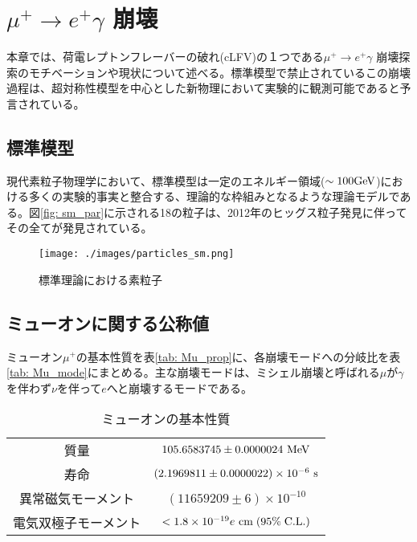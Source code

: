 \documentclass[Yonemoto_master.tex]{subfiles}
\begin{document}
\chapter{$\mu^+ \to e^+ \gamma$ 崩壊}
本章では、荷電レプトンフレーバーの破れ(cLFV)の１つである$\mu^+ \to e^+ \gamma$ 崩壊探索のモチベーションや現状について述べる。標準模型で禁止されているこの崩壊過程は、超対称性模型を中心とした新物理において実験的に観測可能であると予言されている。

\section{標準模型}
現代素粒子物理学において、標準模型は一定のエネルギー領域($\sim 100 {\rm GeV}$)における多くの実験的事実と整合する、理論的な枠組みとなるような理論モデルである。図\ref{fig: sm_par}に示される18の粒子は、2012年のヒッグス粒子発見に伴ってその全てが発見されている。
\begin{figure}[h]
\begin{center}
\texttt{[image: ./images/particles\_sm.png]}
\caption{標準理論における素粒子 \cite{particles_sm}}
\end{center}
\end{figure}
\label{fig: sm_par}

\section{ミューオンに関する公称値}
ミューオン$\mu^+$の基本性質を表\ref{tab: Mu_prop}に、各崩壊モードへの分岐比を表\ref{tab: Mu_mode}にまとめる。主な崩壊モードは、ミシェル崩壊と呼ばれる$\mu$が$\gamma$を伴わず$\nu$を伴って$e$へと崩壊するモードである。

\begin{table}[h]
 \centering
  \begin{tabular}{cc}
   \hline
   質量 & $105.6583745 \pm 0.0000024 \ {\rm MeV}$ \\
   寿命 & $(2.1969811 \pm 0.0000022) \times 10^{-6} \ {\rm s}$ \\ 
   異常磁気モーメント & $(11659209 \pm 6) \times 10^{-10} $ \\
   電気双極子モーメント & $< 1.8 \times 10^{-19} e \ {\rm cm} \; (95\% \; {\rm C.L.})$ \\
   \hline
  \end{tabular}
 \caption{ミューオンの基本性質 \cite{muon}}
\end{table}
\label{tab: Mu_prop}
\end{document}

